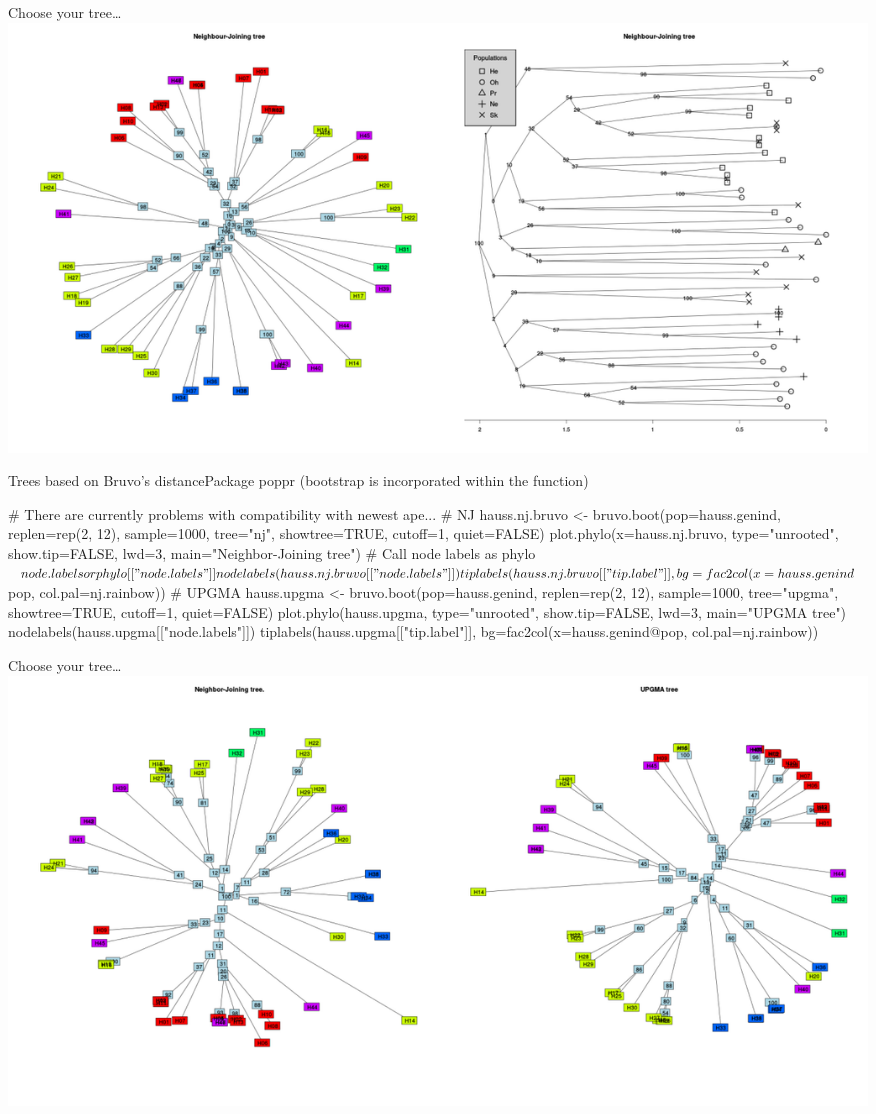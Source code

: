 \documentclass[compress, ucs, xelatex, 11pt, xcolor=svgnames,
  hyperref={
    bookmarks=true,
    unicode=true,
    colorlinks=true,
    pdftitle={Molecular data in R},
    plainpages=false,
    pdfauthor={Vojtech Zeisek},
    pdfsubject={Course about phylogeny and evolution in R},
    pdfcreator={XeLaTeX},
    pdfkeywords={R, evolution, phylogeny, molecular data},
    linkcolor=Tomato,
    anchorcolor=SaddleBrown,
    citecolor=Goldenrod,
    filecolor=DarkMagenta,
    menucolor=Sienna,
    urlcolor=DarkTurquoise,
    pdftex},
  url={hyphens, lowtilde} %
  ]{beamer}
\begin{document}
\begin{frame}{Choose your tree\ldots}
  \includegraphics[width=\textwidth]{nj2.png}
\end{frame}

\begin{frame}[fragile]{Trees based on Bruvo's distance}{Package poppr (bootstrap is incorporated within the function)}
  \begin{spluscode}
    # There are currently problems with compatibility with newest ape...
    # NJ
    hauss.nj.bruvo <- bruvo.boot(pop=hauss.genind, replen=rep(2, 12),
      sample=1000, tree="nj", showtree=TRUE, cutoff=1, quiet=FALSE)
    plot.phylo(x=hauss.nj.bruvo, type="unrooted", show.tip=FALSE,
      lwd=3, main="Neighbor-Joining tree")
    # Call node labels as phylo$node.labels or phylo[["node.labels"]]
    nodelabels(hauss.nj.bruvo[["node.labels"]]) 
    tiplabels(hauss.nj.bruvo[["tip.label"]], bg=fac2col(x=hauss.genind$pop,
      col.pal=nj.rainbow))
    # UPGMA
    hauss.upgma <- bruvo.boot(pop=hauss.genind, replen=rep(2, 12),
      sample=1000, tree="upgma", showtree=TRUE, cutoff=1, quiet=FALSE)
    plot.phylo(hauss.upgma, type="unrooted", show.tip=FALSE, lwd=3,
      main="UPGMA tree")
    nodelabels(hauss.upgma[["node.labels"]])
    tiplabels(hauss.upgma[["tip.label"]], bg=fac2col(x=hauss.genind@pop,
      col.pal=nj.rainbow))
  \end{spluscode}
\end{frame}

\begin{frame}{Choose your tree\ldots}
  \includegraphics[width=\textwidth]{nj-upgma-bruvo.png}
\end{frame}
\end{document}

